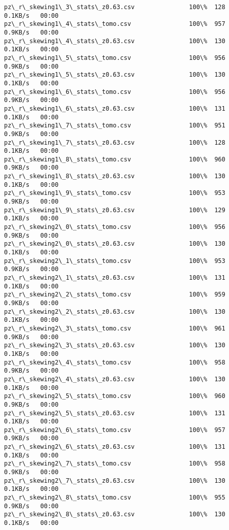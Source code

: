 \documentclass[11pt]{article}
\begin{document}
\begin{Verbatim}[commandchars=\\\{\}]
pz\_r\_skewing1\_3\_stats\_z0.63.csv               100\%  128     0.1KB/s   00:00    
pz\_r\_skewing1\_4\_stats\_tomo.csv                100\%  957     0.9KB/s   00:00    
pz\_r\_skewing1\_4\_stats\_z0.63.csv               100\%  130     0.1KB/s   00:00    
pz\_r\_skewing1\_5\_stats\_tomo.csv                100\%  956     0.9KB/s   00:00    
pz\_r\_skewing1\_5\_stats\_z0.63.csv               100\%  130     0.1KB/s   00:00    
pz\_r\_skewing1\_6\_stats\_tomo.csv                100\%  956     0.9KB/s   00:00    
pz\_r\_skewing1\_6\_stats\_z0.63.csv               100\%  131     0.1KB/s   00:00    
pz\_r\_skewing1\_7\_stats\_tomo.csv                100\%  951     0.9KB/s   00:00    
pz\_r\_skewing1\_7\_stats\_z0.63.csv               100\%  128     0.1KB/s   00:00    
pz\_r\_skewing1\_8\_stats\_tomo.csv                100\%  960     0.9KB/s   00:00    
pz\_r\_skewing1\_8\_stats\_z0.63.csv               100\%  130     0.1KB/s   00:00    
pz\_r\_skewing1\_9\_stats\_tomo.csv                100\%  953     0.9KB/s   00:00    
pz\_r\_skewing1\_9\_stats\_z0.63.csv               100\%  129     0.1KB/s   00:00    
pz\_r\_skewing2\_0\_stats\_tomo.csv                100\%  956     0.9KB/s   00:00    
pz\_r\_skewing2\_0\_stats\_z0.63.csv               100\%  130     0.1KB/s   00:00    
pz\_r\_skewing2\_1\_stats\_tomo.csv                100\%  953     0.9KB/s   00:00    
pz\_r\_skewing2\_1\_stats\_z0.63.csv               100\%  131     0.1KB/s   00:00    
pz\_r\_skewing2\_2\_stats\_tomo.csv                100\%  959     0.9KB/s   00:00    
pz\_r\_skewing2\_2\_stats\_z0.63.csv               100\%  130     0.1KB/s   00:00    
pz\_r\_skewing2\_3\_stats\_tomo.csv                100\%  961     0.9KB/s   00:00    
pz\_r\_skewing2\_3\_stats\_z0.63.csv               100\%  130     0.1KB/s   00:00    
pz\_r\_skewing2\_4\_stats\_tomo.csv                100\%  958     0.9KB/s   00:00    
pz\_r\_skewing2\_4\_stats\_z0.63.csv               100\%  130     0.1KB/s   00:00    
pz\_r\_skewing2\_5\_stats\_tomo.csv                100\%  960     0.9KB/s   00:00    
pz\_r\_skewing2\_5\_stats\_z0.63.csv               100\%  131     0.1KB/s   00:00    
pz\_r\_skewing2\_6\_stats\_tomo.csv                100\%  957     0.9KB/s   00:00    
pz\_r\_skewing2\_6\_stats\_z0.63.csv               100\%  131     0.1KB/s   00:00    
pz\_r\_skewing2\_7\_stats\_tomo.csv                100\%  958     0.9KB/s   00:00    
pz\_r\_skewing2\_7\_stats\_z0.63.csv               100\%  130     0.1KB/s   00:00    
pz\_r\_skewing2\_8\_stats\_tomo.csv                100\%  955     0.9KB/s   00:00    
pz\_r\_skewing2\_8\_stats\_z0.63.csv               100\%  130     0.1KB/s   00:00    

\end{Verbatim}
\end{document}
